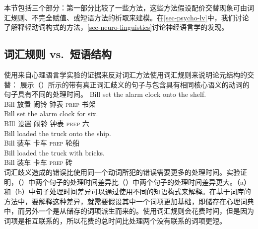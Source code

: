 \begin{exe}
\begin{xlist}[iv.]
\begin{exe}
\begin{xlist}[iv.]
本节包括三个部分：第一部分比较了一些方法，这些方法假设配价交替现象可由词汇规则、不完全赋值、或短语方法的析取来建模。在\ref{sec-psycho-lv}中，我们讨论了解释轻动词构式的方法，\ref{sec-neuro-linguistics}讨论神经语言学的发现。

\subsection{词汇规则 vs.\ 短语结构}
\label{sec-lr-phrasal-psycho}
\mbox{} \citet[\S~1.4.5]{Goldberg95a}使用来自心理语言学实验的证据来反对词汇方法使用词汇规则来说明论元结构的交替： \citet{CT88a}展示（）所示的带有真正词汇歧义的句子与包含具有相同核心语义的动词的句子具有不同的处理时间。
\eal
\ex
\gll Bill set the alarm clock onto the shelf.\\
     Bill 放置  闹铃 钟表 \textsc{prep}  书架\\
\ex
\gll Bill set the alarm clock for six.\\
     BIll 设置  闹铃 钟表 \textsc{prep} 六\\
\zl
\eal
\ex
\gll Bill loaded the truck onto the ship.\\
     Bill 装车  卡车 \textsc{prep}  轮船\\
\ex
\gll Bill loaded the truck with bricks.\\
     Bill 装车  卡车 \textsc{prep} 砖\\
\zl
词汇歧义造成的错误比使用同一个动词所犯的错误需要更多的处理时间。实验证明，（）中两个句子的处理时间差异比（）中两个句子的处理时间差异更大。（a）和（b）中句子处理时间差异可以通过使用不同的短语构式来解释。在基于词库的方法中，要解释这种差异，就需要假设其中一个词项更加基础，即储存在心理词典中，而另外一个是从储存的词项派生而来的。使用词汇规则会花费时间，但是因为词项是相互联系的，所以花费的总时间比处理两个没有联系的词项更短\citep[]{Mueller2002b}。

\end{xlist}
\end{exe}
\end{xlist}
\end{exe}

